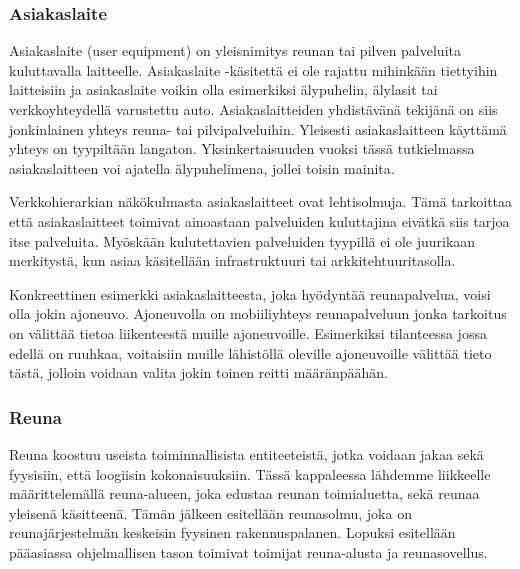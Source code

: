 

\subsubsection{Asiakaslaite}
Asiakaslaite (user equipment) on yleisnimitys reunan tai pilven palveluita kuluttavalla laitteelle.
Asiakaslaite -käsitettä ei ole rajattu mihinkään tiettyihin laitteisiin ja asiakaslaite voikin olla esimerkiksi älypuhelin, älylasit tai verkkoyhteydellä varustettu auto. 
Asiakaslaitteiden yhdistävänä tekijänä on siis jonkinlainen yhteys reuna- tai pilvipalveluihin. Yleisesti asiakaslaitteen käyttämä yhteys on tyypiltään langaton. 
Yksinkertaisuuden vuoksi tässä tutkielmassa asiakaslaitteen voi ajatella älypuhelimena, jollei toisin mainita.

Verkkohierarkian näkökulmasta asiakaslaitteet ovat lehtisolmuja. Tämä tarkoittaa että asiakaslaitteet toimivat ainoastaan palveluiden kuluttajina eivätkä siis tarjoa itse palveluita. Myöskään kulutettavien palveluiden tyypillä ei ole juurikaan merkitystä, kun asiaa käsitellään infrastruktuuri tai arkkitehtuuritasolla.

Konkreettinen esimerkki asiakaslaitteesta, joka hyödyntää reunapalvelua, voisi olla jokin ajoneuvo.
Ajoneuvolla on mobiiliyhteys reunapalveluun jonka tarkoitus on välittää tietoa liikenteestä muille ajoneuvoille. Esimerkiksi tilanteessa jossa edellä on ruuhkaa, voitaisiin muille lähistöllä oleville ajoneuvoille välittää tieto tästä, jolloin voidaan valita jokin toinen reitti määränpäähän.



\subsubsection{Reuna} \label{reunatoimijat}
Reuna koostuu useista toiminnallisista entiteeteistä, jotka voidaan jakaa sekä fyysisiin, että loogiisin kokonaisuuksiin. 
Tässä kappaleessa lähdemme liikkeelle määrittelemällä reuna-alueen, joka edustaa reunan toimialuetta, sekä reunaa yleisenä käsitteenä.
Tämän jälkeen esitellään reunasolmu, joka on reunajärjestelmän keskeisin fyysinen rakennuspalanen. Lopuksi esitellään pääasiassa ohjelmallisen tason toimivat toimijat reuna-alusta ja reunasovellus.

